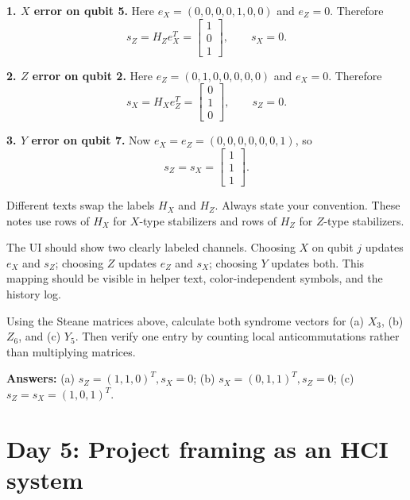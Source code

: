 \documentclass[11pt]{article}
\begin{document}
\begin{workedbox}[title={Two CSS syndrome calculations plus a \(Y\) check}]
\textbf{1. \(X\) error on qubit 5.} Here \(e_X=(0,0,0,0,1,0,0)\) and \(e_Z=0\). Therefore
\[
s_Z=H_Ze_X^T=\begin{bmatrix}1\\0\\1\end{bmatrix},\qquad s_X=0.
\]

\textbf{2. \(Z\) error on qubit 2.} Here \(e_Z=(0,1,0,0,0,0,0)\) and \(e_X=0\). Therefore
\[
s_X=H_Xe_Z^T=\begin{bmatrix}0\\1\\0\end{bmatrix},\qquad s_Z=0.
\]

\textbf{3. \(Y\) error on qubit 7.} Now \(e_X=e_Z=(0,0,0,0,0,0,1)\), so
\[
s_Z=s_X=\begin{bmatrix}1\\1\\1\end{bmatrix}.
\]
\end{workedbox}

\begin{warningbox}
Different texts swap the labels \(H_X\) and \(H_Z\). Always state your convention. These notes use
rows of \(H_X\) for \(X\)-type stabilizers and rows of \(H_Z\) for \(Z\)-type stabilizers.
\end{warningbox}

\begin{hcibox}
The UI should show two clearly labeled channels. Choosing \(X\) on qubit \(j\) updates
\(e_X\) and \(s_Z\); choosing \(Z\) updates \(e_Z\) and \(s_X\); choosing \(Y\) updates both.
This mapping should be visible in helper text, color-independent symbols, and the history log.
\end{hcibox}

\begin{masterybox}[title={Day 4 exercises}]
Using the Steane matrices above, calculate both syndrome vectors for
(a) \(X_3\), (b) \(Z_6\), and (c) \(Y_5\). Then verify one entry by counting local
anticommutations rather than multiplying matrices.

\textbf{Answers:} (a) \(s_Z=(1,1,0)^T,s_X=0\); (b)
\(s_X=(0,1,1)^T,s_Z=0\); (c) \(s_Z=s_X=(1,0,1)^T\).
\end{masterybox}

\section{Day 5: Project framing as an HCI system}
\end{document}
